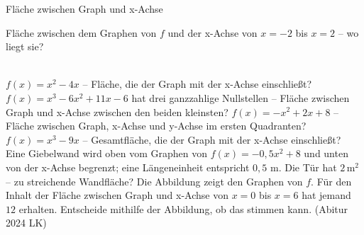 \setcounter{aufgabe}{8}

\begin{aufgabe}{Fläche zwischen Graph und x-Achse}
\begin{teile}
\teil Fläche zwischen dem Graphen von $f$ und der x-Achse von $x = -2$ bis $x = 2$ – wo liegt sie? \\ \\ 

\begin{ksys}[xmin=-3,xmax=4,ymin=-5,ymax=5,ablesen]\end{ksys}
\teil $f(x) = x^2 - 4x$ – Fläche, die der Graph mit der x-Achse einschließt?
\teil $f(x) = x^3 - 6x^2 + 11x - 6$ hat drei ganzzahlige Nullstellen – Fläche zwischen Graph und x-Achse zwischen den beiden kleinsten?
\teil $f(x) = -x^2 + 2x + 8$ – Fläche zwischen Graph, x-Achse und y-Achse im ersten Quadranten?
\teil $f(x) = x^3 - 9x$ – Gesamtfläche, die der Graph mit der x-Achse einschließt?
\teil Eine Giebelwand wird oben vom Graphen von $f(x) = -0{,}5x^2 + 8$ und unten von der x-Achse begrenzt; eine Längeneinheit entspricht $0{,}5$ m. Die Tür hat $2\,\text{m}^2$ – zu streichende Wandfläche?
\teil Die Abbildung zeigt den Graphen von $f$. Für den Inhalt der Fläche zwischen Graph und x-Achse von $x = 0$ bis $x = 6$ hat jemand $12$ erhalten. Entscheide mithilfe der Abbildung, ob das stimmen kann. \hfill (Abitur 2024 LK)

\begin{ksys}[xmin=-1,xmax=7,ymin=-5,ymax=2,ablesen]\end{ksys}
\end{teile}
\end{aufgabe}

